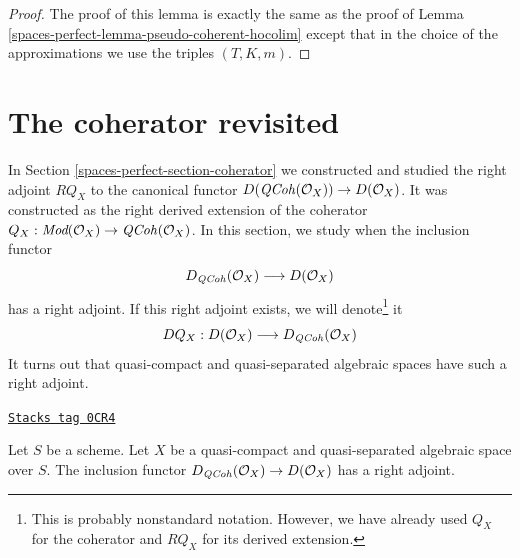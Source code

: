 \begin{proof}
The proof of this lemma is exactly the same as the proof of
Lemma \ref{spaces-perfect-lemma-pseudo-coherent-hocolim}
except that in the choice of the approximations we use
the triples $(T, K, m)$.
\end{proof}

\section{The coherator revisited}
\label{spaces-perfect-section-better-coherator}
In Section \ref{spaces-perfect-section-coherator} we constructed and studied
the right adjoint $RQ_X$ to the canonical functor
$D(\mathit{QCoh}(\mathcal{O}_X)) \to D(\mathcal{O}_X)$.
It was constructed as the right derived extension of the coherator
$Q_X : \textit{Mod}(\mathcal{O}_X) \to \mathit{QCoh}(\mathcal{O}_X)$.
In this section, we study when the inclusion functor
$$
D_{\mathit{QCoh}}(\mathcal{O}_X) \longrightarrow D(\mathcal{O}_X)
$$
has a right adjoint. If this right adjoint exists, we will
denote\footnote{This is probably nonstandard notation. However, we have already
used $Q_X$ for the coherator and $RQ_X$ for its derived extension.} it
$$
DQ_X :
D(\mathcal{O}_X) \longrightarrow D_{\mathit{QCoh}}(\mathcal{O}_X)
$$
It turns out that quasi-compact and quasi-separated
algebraic spaces have such a right adjoint.

\begin{lemma}
\label{spaces-perfect-lemma-better-coherator}
\href{https://stacks.math.columbia.edu/tag/0CR4}{\texttt{Stacks tag 0CR4}}

Let $S$ be a scheme.
Let $X$ be a quasi-compact and quasi-separated algebraic space over $S$.
The inclusion functor $D_{\mathit{QCoh}}(\mathcal{O}_X) \to D(\mathcal{O}_X)$
has a right adjoint.
\end{lemma}

